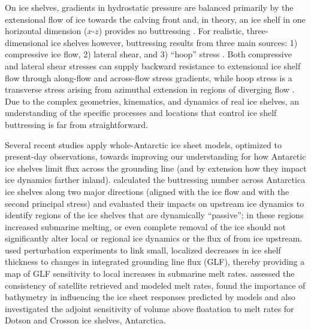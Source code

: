\documentclass[tc, manuscript]{copernicus}
\begin{document}
On ice shelves, gradients in hydrostatic pressure are balanced primarily by the extensional flow of ice towards the calving front \citep{hutter1983, morland1987, schoof2007} and, in theory, an ice shelf in one horizontal dimension ($x$-$z$) provides no buttressing \citep{schoof2007,gudmundsson2013}. For realistic, three-dimensional ice shelves however,  buttressing results from three main sources: 1) compressive ice flow, 2) lateral shear, and 3) ``hoop'' stress \citep{pegler2012}. Both compressive and lateral shear stresses can supply backward resistance to extensional ice shelf flow through along-flow and across-flow stress gradients, while hoop stress is a transverse stress arising from azimuthal extension in regions of diverging flow \citep{wearing2016}.  Due to the complex geometries, kinematics, and dynamics of real ice shelves, an understanding of the specific processes and locations that control ice shelf buttressing is far from straightforward.

Several recent studies apply whole-Antarctic ice sheet models, optimized to present-day observations, towards improving our understanding for how Antarctic ice shelves limit flux across the grounding line (and by extension how they impact ice dynamics farther inland). \citet{furst2016} calculated the buttressing number across Antarctica ice shelves along two major directions (aligned with the ice flow and with the second principal stress) and evaluated their impacts on upstream ice dynamics to identify regions of the ice shelves that are dynamically ``passive''; in these regions increased submarine melting, or even complete removal of the ice should not significantly alter local or regional ice dynamics or the flux of from ice upstream. \citet{reese2018} used perturbation experiments to link small, localized decreases in ice shelf thickness to changes in integrated grounding line flux (GLF), thereby providing a map of GLF sensitivity to local increases in submarine melt rates. \citet{Goldberg2019} assessed the consistency of satellite retrieved and modeled melt rates, found the importance of bathymetry in influencing the ice sheet responses predicted by models and also investigated the adjoint sensitivity of volume above floatation to melt rates for Dotson and Crosson ice shelves, Antarctica.
\end{document}
